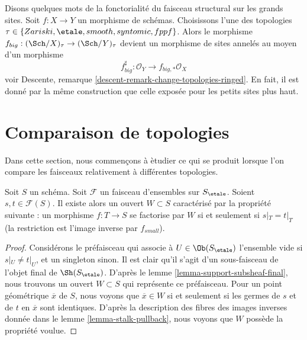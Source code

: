 \medskip\noindent
Disons quelques mots de la fonctorialit\'e du faisceau structural sur les grands sites.
Soit $f : X \to Y$ un morphisme de sch\'emas. Choisissons l'une des
topologies $\tau \in \{Zariski,\linebreak[0]
\etale,\linebreak[0] smooth,\linebreak[0] syntomic,\linebreak[0]
fppf\}$. Alors le morphisme
$f_{big} : (\Sch/X)_\tau \to (\Sch/Y)_\tau$
devient un morphisme de sites annel\'es au moyen d'un morphisme
$$
f_{big}^\sharp : \mathcal{O}_Y \longrightarrow f_{big, *}\mathcal{O}_X
$$
voir Descente, remarque \ref{descent-remark-change-topologies-ringed}.
En fait, il est donn\'e par la m\^eme construction que celle expos\'ee pour les petits
sites plus haut.












\section{Comparaison de topologies}
\label{section-compare-topologies}

\noindent
Dans cette section, nous commen\c{c}ons \`a \`etudier ce qui se produit lorsque l'on compare
les faisceaux relativement \`a diff\'erentes topologies.

\begin{lemma}
\label{lemma-where-sections-are-equal}
Soit $S$ un sch\'ema. Soit $\mathcal{F}$ un faisceau d'ensembles sur $S_\etale$.
Soient $s, t \in \mathcal{F}(S)$. Il existe alors un ouvert $W \subset S$
caract\'eris\'e par la propri\'et\'e suivante : un morphisme $f : T \to S$
se factorise par $W$ si et seulement si $s|_T = t|_T$ (la restriction est
l'image inverse par $f_{small}$).
\end{lemma}

\begin{proof}
Consid\'erons le pr\'efaisceau qui associe \`a $U \in \Ob(S_\etale)$ l'ensemble vide
si $s|_U \not = t|_U$, et un singleton sinon. Il est clair qu'il s'agit
d'un sous-faisceau de l'objet final de $\Sh(S_\etale)$. D'apr\`es le
lemme \ref{lemma-support-subsheaf-final},
nous trouvons un ouvert $W \subset S$ qui repr\'esente ce pr\'efaisceau.
Pour un point g\'eom\'etrique $\overline{x}$ de $S$, nous voyons que $\overline{x} \in W$
si et seulement si les germes de $s$ et de $t$ en $\overline{x}$ sont identiques.
D'apr\`es la description des fibres des images inverses donn\'ee dans le
lemme \ref{lemma-stalk-pullback},
nous voyons que $W$ poss\`ede la propri\'et\'e voulue.
\end{proof}

